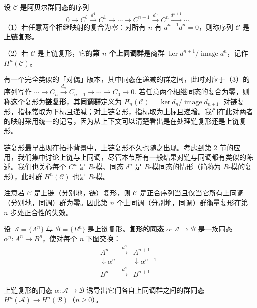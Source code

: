 \begin{definition}
设 \(\mathcal{C}\) 是阿贝尔群同态的序列
\[
0 \longrightarrow C^0 \xrightarrow{d^1} C^1 \longrightarrow \cdots \longrightarrow C^{n-1} \xrightarrow{d^n} C^n \xrightarrow{d^{n+1}} \cdots. \tag{17.3}
\]
（1）若任意两个相继映射的复合为零：对所有 \(n\) 有 \(d^{n+1}d^n = 0\)，则称序列 \(\mathcal{C}\) 是\textbf{上链复形}。

（2）若 \(\mathcal{C}\) 是上链复形，它的\textbf{第 \(n\) 个上同调群}是商群 \(\ker d^{n+1}/\operatorname{image}d^n\)，记作 \(H^n(\mathcal{C})\)。
\end{definition}

有一个完全类似的「对偶」版本，其中同态在递减的群之间，此时对应于（3）的序列写作 \(\cdots \to C_n \xrightarrow{d_n} C_{n-1} \to \cdots \to C_0 \to 0\). 若任意两个相继同态的复合为零，则称这个复形为\textbf{链复形}，其\textbf{同调群}定义为 \(H_n(\mathcal{C}) = \ker d_n/\operatorname{image}d_{n+1}\). 对链复形，指标常取为下标且递减；对上链复形，指标取为上标且递增。我们在此对两者的映射采用统一的记号，因为从上下文可以清楚看出是在处理链复形还是上链复形。

链复形最早出现在拓扑背景中，上链复形不久也随之出现。考虑到第 2 节的应用，我们集中讨论上链与上同调，尽管本节所有一般结果对链与同调都有类似的陈述。我们也关心每个 \(C^n\) 是 \(R\)-模、同态 \(d^n\) 是 \(R\)-模同态的情形（简称为 \(R\)-模的复形），此时群 \(H^n(\mathcal{C})\) 也是 \(R\)-模。

注意若 \(\mathcal{C}\) 是上链（分别地，链）复形，则 \(\mathcal{C}\) 是正合序列当且仅当它所有上同调（分别地，同调）群为零。因此第 \(n\) 个上同调（分别地，同调）群衡量复形在第 \(n\) 步处正合性的失效。

\begin{definition}
设 \(\mathcal{A} = \{A^n\}\) 与 \(\mathcal{B} = \{B^n\}\) 是上链复形。\textbf{复形的同态} \(\alpha : \mathcal{A} \to \mathcal{B}\) 是一族同态 \(\alpha^n : A^n \to B^n\)，使对每个 \(n\) 下图交换：
\[
\begin{array}{ccc}
A^n & \xrightarrow{d^n} & A^{n+1}\\
\downarrow\alpha^n & & \downarrow\alpha^{n+1}\\
B^n & \xrightarrow{d^n} & B^{n+1}
\end{array} \tag{17.4}
\]
\end{definition}

\begin{proposition}\label{pro:17.1}
上链复形的同态 \(\alpha : \mathcal{A} \to \mathcal{B}\) 诱导出它们各自上同调群之间的群同态 \(H^n(\mathcal{A}) \to H^n(\mathcal{B})\)（\(n \geq 0\)）。
\end{proposition}

